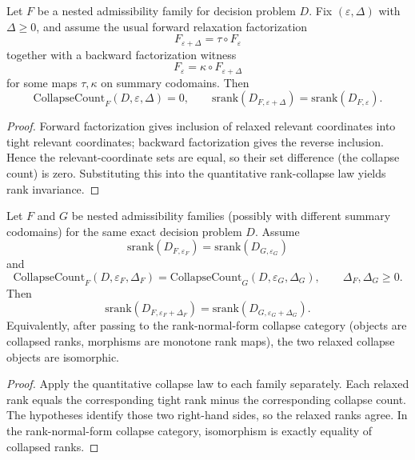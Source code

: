 \begin{theorem}\label{thm:admissibility-zero-collapse-bifactor}
Let $F$ be a nested admissibility family for decision problem $D$. Fix $(\varepsilon,\Delta)$ with $\Delta\ge 0$, and assume the usual forward relaxation factorization
\[
F_{\varepsilon+\Delta}=\tau\circ F_{\varepsilon}
\]
together with a backward factorization witness
\[
F_{\varepsilon}=\kappa\circ F_{\varepsilon+\Delta}
\]
for some maps $\tau,\kappa$ on summary codomains. Then
\[
\mathrm{CollapseCount}_F(D,\varepsilon,\Delta)=0,
\qquad
\mathrm{srank}(D_{F,\varepsilon+\Delta})=\mathrm{srank}(D_{F,\varepsilon}).
\]
\end{theorem}

\begin{proof}
Forward factorization gives inclusion of relaxed relevant coordinates into tight relevant coordinates; backward factorization gives the reverse inclusion. Hence the relevant-coordinate sets are equal, so their set difference (the collapse count) is zero. Substituting this into the quantitative rank-collapse law yields rank invariance.
\end{proof}

\begin{theorem}\label{thm:admissibility-collapse-canonicality}
Let $F$ and $G$ be nested admissibility families (possibly with different summary codomains) for the same exact decision problem $D$. Assume
\[
\mathrm{srank}(D_{F,\varepsilon_F})
=
\mathrm{srank}(D_{G,\varepsilon_G})
\]
and
\[
\mathrm{CollapseCount}_F(D,\varepsilon_F,\Delta_F)
=
\mathrm{CollapseCount}_G(D,\varepsilon_G,\Delta_G),
\qquad
\Delta_F,\Delta_G\ge 0.
\]
Then
\[
\mathrm{srank}(D_{F,\varepsilon_F+\Delta_F})
=
\mathrm{srank}(D_{G,\varepsilon_G+\Delta_G}).
\]
Equivalently, after passing to the rank-normal-form collapse category (objects are collapsed ranks, morphisms are monotone rank maps), the two relaxed collapse objects are isomorphic.
\end{theorem}

\begin{proof}
Apply the quantitative collapse law to each family separately. Each relaxed rank equals the corresponding tight rank minus the corresponding collapse count. The hypotheses identify those two right-hand sides, so the relaxed ranks agree. In the rank-normal-form collapse category, isomorphism is exactly equality of collapsed ranks.
\end{proof}

